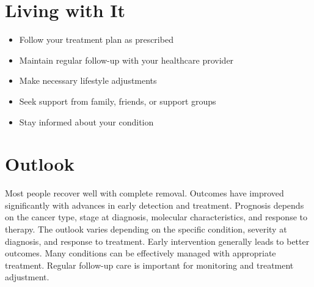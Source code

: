 \section{Living with It}
\begin{itemize}[noitemsep]
  \item Follow your treatment plan as prescribed
  \item Maintain regular follow-up with your healthcare provider
  \item Make necessary lifestyle adjustments
  \item Seek support from family, friends, or support groups
  \item Stay informed about your condition
\end{itemize}
\section{Outlook}
Most people recover well with complete removal. Outcomes have improved significantly with advances in early detection and treatment. Prognosis depends on the cancer type, stage at diagnosis, molecular characteristics, and response to therapy. The outlook varies depending on the specific condition, severity at diagnosis, and response to treatment. Early intervention generally leads to better outcomes. Many conditions can be effectively managed with appropriate treatment. Regular follow-up care is important for monitoring and treatment adjustment.
